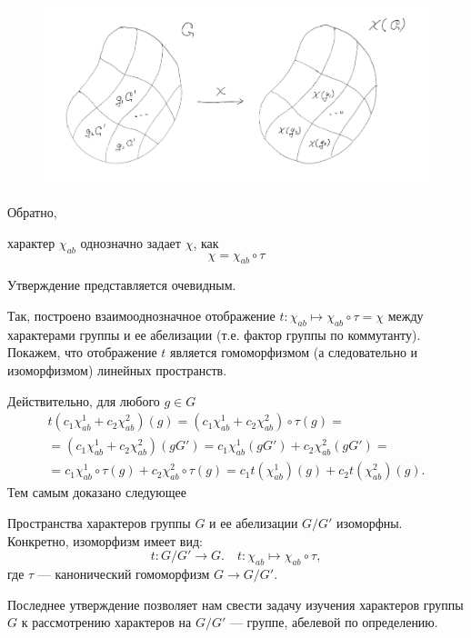     \begin{figure}[th]
        \centering
        \includegraphics[width=\textwidth]{pictures/chips}
        \caption{}
        \label{img_chi_factor}
    \end{figure}

    Обратно,
    \begin{statement} характер $\chi_{ab}$ однозначно задает $\chi$, как 
        \[\chi = \chi_{ab}\circ \tau\]
    \end{statement}
    Утверждение представляется очевидным.

    Так, построено взаимооднозначное отображение $t: \chi_{ab} \mapsto 
    \chi_{ab} \circ \tau = \chi$ между характерами группы и ее абелизации 
    (т.е. фактор группы по коммутанту). Покажем, что отображение $t$ является 
    гомоморфизмом (а следовательно и изоморфизмом) линейных пространств.

    Действительно, для любого $g \in G$
        \begin{multline*}
        t(c_1\chi_{ab}^1 + c_2\chi_{ab}^2)(g) 
        = (c_1\chi_{ab}^1 + c_2\chi_{ab}^2) \circ \tau (g) = \\
        = (c_1\chi_{ab}^1 + c_2\chi_{ab}^2) (gG')
        = c_1\chi_{ab}^1 (gG') + c_2\chi_{ab}^2 (gG') = \\
        = c_1\chi_{ab}^1 \circ \tau (g) + c_2\chi_{ab}^2 \circ \tau (g)
        = c_1 t(\chi_{ab}^1)(g) + c_2 t(\chi_{ab}^2)(g).
        \end{multline*}
    Тем самым доказано следующее
    \begin{statement}
        Пространства характеров группы $G$ и ее абелизации $G/G'$ изоморфны. 
        Конкретно, изоморфизм имеет вид:
        \begin{equation}\label{iso_GG'}
            t: G/G' \to G.\quad t: \chi_{ab} \mapsto \chi_{ab} \circ \tau,
        \end{equation}
        где $\tau$ --- канонический гомоморфизм $G \to G/G'$.
    \end{statement}
    
    Последнее утверждение позволяет нам свести задачу изучения характеров
    группы $G$ к рассмотрению характеров на $G/G'$ --- группе, абелевой по 
    определению.